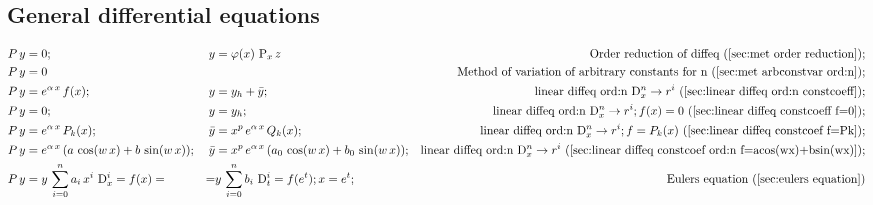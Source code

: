\documentclass["AM3C-Slides_annotations.tex"]{subfiles}
\begin{document}
\begin{minipage}{60em}
\begin{sectionBox}
\begin{minipage}{60em}
      \subsection*{General differential equations}
      \begin{tcolorbox}
        \begin{align*}
          P\,y &= 0
          ;&
          y &= \varphi(x)\,\prim_x{z}
          & \text{Order reduction of diffeq (\ref{sec:met order reduction})}
          ; \\
          P\,y &= 0
          &&& \text{Method of variation of arbitrary constants for n (\ref{sec:met arbconstvar ord:n})}
          ; \\
          P\,y &= e^{\alpha\,x}\,f(x)
          ; &
          y &= y_h + \bar{y}
          ; & \text{linear diffeq ord:n \(\mdif[n]{x} \to r^i\) (\ref{sec:linear diffeq ord:n constcoeff})}
          ; \\
          P\,y &= 0
          ; &
          y &= y_h
          ; & \text{linear diffeq ord:n \(\mdif[n]{x} \to r^i; f(x)=0\) (\ref{sec:linear diffeq constcoeff f=0})}
          ; \\
          P\,y &= e^{\alpha\,x}\,P_k(x)
          ; &
          \bar{y} &= x^p\,e^{\alpha\,x}\,Q_k(x)
          ; & \text{linear diffeq ord:n \(\mdif[n]{x} \to r^i; f=P_k(x)\) (\ref{sec:linear diffeq constcoef f=Pk})}
          ; \\
          P\,y &= e^{\alpha\,x}\,(a\,\cos(w\,x)+b\,\sin(w\,x))
          ; &
          \bar{y} &= x^p\,e^{\alpha\,x}\,(a_0\,\cos(w\,x)+b_0\,\sin(w\,x))
          ; & \text{linear diffeq ord:n \(\mdif[n]{x} \to r^i\) (\ref{sec:linear diffeq constcoef ord:n f=acos(wx)+bsin(wx)})}
          ;\\
          P\,y
          &= y\,\sum_{i=0}^{n}{a_i\,x^i\,\mdif[i]{x}}
          = f(x)
          = &
          = & y\,\sum_{i=0}^{n}{b_i\,\mdif[i]{t}}
          = f(e^t)
          ; x=e^t
          ; &
          \text{Eulers equation (\ref{sec:eulers equation})}
        \end{align*}
      \end{tcolorbox}
    \end{minipage}
    
    \begin{minipage}{60em}

\end{minipage}
\end{sectionBox}
\end{minipage}
\end{document}
